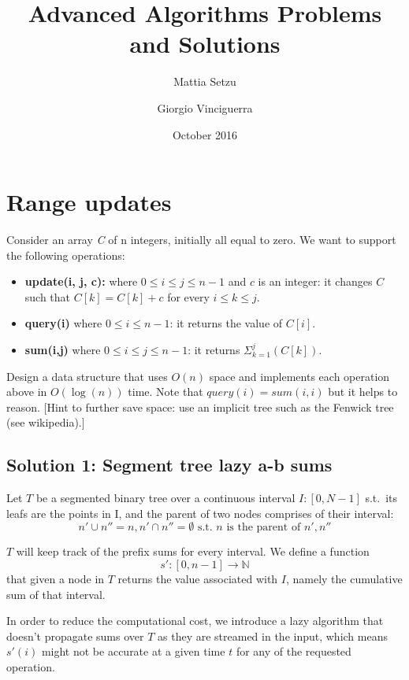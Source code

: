 \documentclass{article}
\title{Advanced Algorithms Problems and Solutions}
\author{Mattia Setzu \and Giorgio Vinciguerra}
\date{October 2016}
\begin{document}
\maketitle

\tableofcontents
\clearpage


\newpage
\section{Range updates}

Consider an array \emph{C} of n integers, initially all equal to zero.
We want to support the following operations:
\begin{itemize}
    \item \textbf{update(i, j, c):} where $0 \leq i \leq j \leq n - 1$ and $c$ is
    an integer: it changes $C$ such that $C[k] = C[k] + c$ for every $i \leq k \leq j$.
    \item \textbf{query(i)} where $0 \leq i \leq n - 1$: it returns the value of $C[i]$.
    \item \textbf{sum(i,j)} where $0 \leq i \leq j \leq n - 1$: it returns
                    $\Sigma_{k = 1}^{j}(C[k])$.
\end{itemize}

Design a data structure that uses $O(n)$ space and implements each operation above
in $O(\log(n))$ time. Note that $query(i) = sum(i, i)$ but it helps to reason.
[Hint to further save space: use an implicit tree such as the Fenwick tree (see wikipedia).]

\subsection{Solution 1: Segment tree lazy a-b sums}
Let $T$ be a segmented binary tree over a continuous interval $I: [0, N - 1]$
s.t.\ its leafs are the points in I, and the parent of two nodes comprises of their interval:
$$  n' \cup n'' = n, n' \cap n'' = \emptyset   \textrm{ s.t. } n \text{ is the parent of } n', n''$$

$T$ will keep track of the prefix sums for every interval.
We define a function
\begin{equation}
    s': [0, n - 1] \to \mathbb{N}
\end{equation}
that given a node in $T$ returns the value associated with $I$, namely the
cumulative sum of that interval.

In order to reduce the computational cost, we introduce a lazy algorithm
that doesn't propagate sums over $T$ as they are streamed in the input,
which means $s'(i)$ might not be accurate at a given time $t$ for any of the
requested operation.
\end{document}
